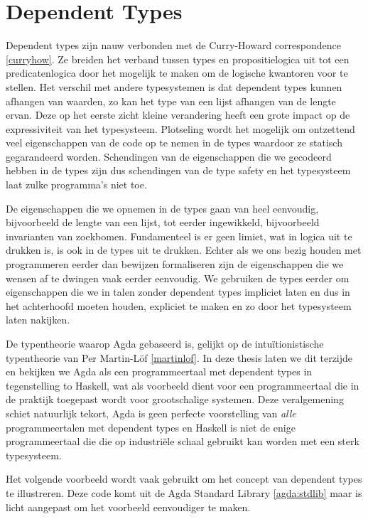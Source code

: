 \section{Dependent Types}

Dependent types zijn nauw verbonden met de Curry-Howard correspondence
\ref{curryhow}. Ze breiden het verband tussen types en propositielogica uit tot
een predicatenlogica door het mogelijk te maken om de logische kwantoren voor
te stellen. Het verschil met andere typesystemen is dat dependent types kunnen
afhangen van waarden, zo kan het type van een lijst afhangen van de lengte
ervan. Deze op het eerste zicht kleine verandering heeft een grote impact op de
expressiviteit van het typesysteem. Plotseling wordt het mogelijk om ontzettend
veel eigenschappen van de code op te nemen in de types waardoor ze statisch
gegarandeerd worden. Schendingen van de eigenschappen die we gecodeerd hebben
in de types zijn dus schendingen van de type safety en het typesysteem laat
zulke programma's niet toe.

De eigenschappen die we opnemen in de types gaan van heel eenvoudig,
bijvoorbeeld de lengte van een lijst, tot eerder ingewikkeld, bijvoorbeeld
invarianten van zoekbomen. Fundamenteel is er geen limiet, wat in logica uit te
drukken is, is ook in de types uit te drukken. Echter als we ons bezig houden
met programmeren eerder dan bewijzen formaliseren zijn de eigenschappen die we
wensen af te dwingen vaak eerder eenvoudig. We gebruiken de types eerder om
eigenschappen die we in talen zonder dependent types impliciet laten en dus in
het achterhoofd moeten houden, expliciet te maken en zo door het typesysteem
laten nakijken.

De typentheorie waarop Agda gebaseerd is, gelijkt op de intuïtionistische
typentheorie van Per Martin-Löf \ref{martinlof}. In deze thesis laten we dit
terzijde en bekijken we Agda als een programmeertaal met dependent types in
tegenstelling to Haskell, wat als voorbeeld dient voor een programmeertaal die
in de praktijk toegepast wordt voor grootschalige systemen. Deze veralgemening
schiet natuurlijk tekort, Agda is geen perfecte voorstelling van \emph{alle}
programmeertalen met dependent types en Haskell is niet de enige
programmeertaal die die op industriële schaal gebruikt kan worden met een sterk
typesysteem.

Het volgende voorbeeld wordt vaak gebruikt om het concept van dependent types
te illustreren. Deze code komt uit de Agda Standard Library \ref{agda:stdlib}
maar is licht aangepast om het voorbeeld eenvoudiger te maken.

